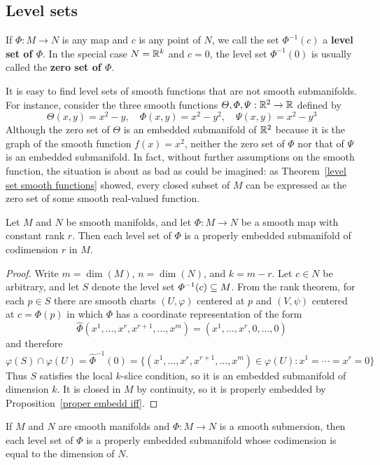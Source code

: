 \subsection{Level sets}
If $\varPhi:M\to N$ is any map and $c$ is any point of $N$, we call the set $\varPhi^{-1}(c)$ a \textbf{level set of $\bm{\varPhi}$}. In the special case $N=\mathbb{R}^k$ and $c=0$, the level set $\varPhi^{-1}(0)$ is usually called the \textbf{zero set of $\bm{\varPhi}$}.\par
It is easy to find level sets of smooth functions that are not smooth submanifolds.
For instance, consider the three smooth functions $\varTheta,\varPhi,\varPsi:\mathbb{R}^2\to\mathbb{R}$ defined by
\[\varTheta(x,y)=x^2-y,\quad \varPhi(x,y)=x^2-y^2,\quad \varPsi(x,y)=x^2-y^3\]
Although the zero set of $\varTheta$ is an embedded submanifold of $\mathbb{R}^2$ because it is the graph of the smooth function $f(x)=x^2$, neither the zero set of $\varPhi$ nor that of $\varPsi$ is an embedded submanifold. In fact, without further assumptions on the smooth function, the situation is about as bad as could be imagined: as Theorem~\ref{level set smooth functions} showed, every closed subset of $M$ can be expressed as the zero set of some smooth real-valued function.
\begin{theorem}\label{constant rank level set}
Let $M$ and $N$ be smooth manifolds, and let $\varPhi:M\to N$ be a smooth map with constant rank $r$. Then each level set of $\varPhi$ is a properly embedded submanifold of codimension $r$ in $M$.
\end{theorem}
\begin{proof}
Write $m=\dim(M)$, $n=\dim(N)$, and $k=m-r$. Let $c\in N$ be arbitrary, and let $S$ denote the level set $\varPhi^{-1}(c)\subseteq M$. From the rank theorem, for each $p\in S$ there are smooth charts $(U,\varphi)$ centered at $p$ and $(V,\psi)$ centered at $c=\varPhi(p)$ in which $\varPhi$ has a coordinate representation of the form
\[\widehat{\varPhi}(x^1,\dots,x^r,x^{r+1},\dots,x^m)=(x^1,\dots,x^r,0,\dots,0)\]
and therefore
\[\varphi(S)\cap\varphi(U)=\widehat{\varPhi}^{-1}(0)=\{(x^1,\dots,x^r,x^{r+1},\dots,x^m)\in \varphi(U):x^1=\cdots=x^r=0\}\]
Thus $S$ satisfies the local $k$-slice condition, so it is an embedded submanifold of
dimension $k$. It is closed in $M$ by continuity, so it is properly embedded by Proposition~\ref{proper embedd iff}.
\end{proof}
\begin{corollary}\label{subm level set}
If $M$ and $N$ are smooth manifolds and $\varPhi:M\to N$ is a smooth submersion, then each level set of $\varPhi$ is a properly embedded submanifold whose codimension is equal to the dimension of $N$.
\end{corollary}
